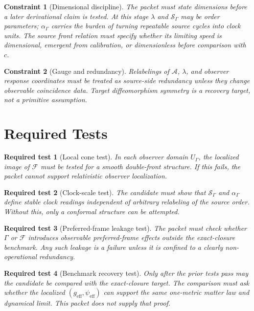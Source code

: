 \documentclass[11pt]{article}
\newcommand{\Sub}{\mathcal{A}}
\newcommand{\Front}{\mathcal{F}}
\newcommand{\Order}{\mathcal{S}}
\newtheorem{constraint}{Constraint}
\newtheorem{test}{Required test}
\begin{document}
\begin{constraint}[Dimensional discipline]
The packet must state dimensions before a later derivational claim is tested.
At this stage \(\lambda\) and \(\Order_{\Gamma}\) may be order parameters;
\(\alpha_{\Gamma}\) carries the burden of turning repeatable source cycles into
clock units. The source front relation must specify whether its limiting speed
is dimensional, emergent from calibration, or dimensionless before comparison
with \(c\).
\end{constraint}

\begin{constraint}[Gauge and redundancy]
Relabelings of \(\Sub\), \(\lambda\), and observer response coordinates must be
treated as source-side redundancy unless they change observable coincidence
data. Target diffeomorphism symmetry is a recovery target, not a primitive
assumption.
\end{constraint}

\section{Required Tests}

\begin{test}[Local cone test]
In each observer domain \(U_{\Gamma}\), the localized image of \(\Front\) must
be tested for a smooth double-front structure. If this fails, the packet cannot
support relativistic observer localization.
\end{test}

\begin{test}[Clock-scale test]
The candidate must show that \(\Order_{\Gamma}\) and \(\alpha_{\Gamma}\) define
stable clock readings independent of arbitrary relabeling of the source order.
Without this, only a conformal structure can be attempted.
\end{test}

\begin{test}[Preferred-frame leakage test]
The packet must check whether \(\Gamma\) or \(\Front\) introduces observable
preferred-frame effects outside the exact-closure benchmark. Any such leakage is
a failure unless it is confined to a clearly non-operational redundancy.
\end{test}

\begin{test}[Benchmark recovery test]
Only after the prior tests pass may the candidate be compared with the
exact-closure target. The comparison must ask whether the localized
\((g_{\mathrm{eff}},\psi_{\mathrm{eff}})\) can support the same one-metric
matter law and dynamical limit. This packet does not supply that proof.
\end{test}
\end{document}
